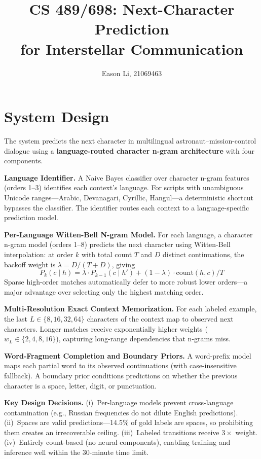 \documentclass[11pt]{article}
\title{\vspace{-1.5em}CS 489/698: Next-Character Prediction \\ for Interstellar Communication\vspace{-0.5em}}
\author{Eason Li, 21069463}
\date{}
\begin{document}
\maketitle
\vspace{-2em}

\section{System Design}

The system predicts the next character in multilingual astronaut--mission-control dialogue using a \textbf{language-routed character n-gram architecture} with four components.

\textbf{Language Identifier.}
A Naive Bayes classifier over character n-gram features (orders 1--3) identifies each context's language. For scripts with unambiguous Unicode ranges---Arabic, Devanagari, Cyrillic, Hangul---a deterministic shortcut bypasses the classifier. The identifier routes each context to a language-specific prediction model.

\textbf{Per-Language Witten-Bell N-gram Model.}
For each language, a character n-gram model (orders 1--8) predicts the next character using Witten-Bell interpolation: at order $k$ with total count $T$ and $D$ distinct continuations, the backoff weight is $\lambda = D/(T+D)$, giving 
\[ P_k(c \mid h) = \lambda \cdot P_{k-1}(c \mid h') + (1-\lambda) \cdot \text{count}(h,c)/T\] 
Sparse high-order matches automatically defer to more robust lower orders---a major advantage over selecting only the highest matching order.

\textbf{Multi-Resolution Exact Context Memorization.}
For each labeled example, the last $L \in \{8, 16, 32, 64\}$ characters of the context map to observed next characters. Longer matches receive exponentially higher weights ($w_L \in \{2, 4, 8, 16\}$), capturing long-range dependencies that n-grams miss.

\textbf{Word-Fragment Completion and Boundary Priors.}
A word-prefix model maps each partial word to its observed continuations (with case-insensitive fallback). A boundary prior conditions predictions on whether the previous character is a space, letter, digit, or punctuation.

\textbf{Key Design Decisions.}
(i)~Per-language models prevent cross-language contamination (e.g., Russian frequencies do not dilute English predictions).
(ii)~Spaces are valid predictions---14.5\% of gold labels are spaces, so prohibiting them creates an irrecoverable ceiling.
(iii)~Labeled transitions receive $3\times$ weight.
(iv)~Entirely count-based (no neural components), enabling training and inference well within the 30-minute time limit.
\end{document}
